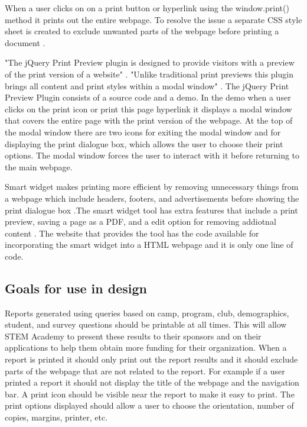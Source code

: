 \documentclass[12pt, draftclsnofoot, onecolumn]{IEEEtran}
\begin{document}
When a user clicks on on a print button or hyperlink using the window.print() method it prints out the entire webpage\cite{JavaScript}. To resolve the issue a separate CSS style sheet is created to exclude unwanted parts of the webpage before printing a document \cite{JavaScript}. 

"The jQuery Print Preview plugin is designed to provide visitors with a preview of the print version of a website" \cite{Sam}. "Unlike traditional print previews this plugin brings all content and print styles within a modal window" \cite{Sam}. The jQuery Print Preview Plugin consists of a source code and a demo. In the demo when a user clicks on the print icon or print this page hyperlink it displays a modal window that covers the entire page with the print version of the webpage. At the top of the modal window there are two icons for exiting the modal window and for displaying the print dialogue box, which allows the user to choose their print options. The modal window forces the user to interact with it before returning to the main webpage.

Smart widget makes printing more efficient by removing unnecessary things from a webpage which include headers, footers, and advertisements before showing the print dialogue box \cite{SmartW}.The smart widget tool has extra features that include a print preview, saving a page as a PDF, and a edit option for removing addiotnal content \cite{SmartW}. The website that provides the tool has the code available for incorporating the smart widget into a HTML webpage and it is only one line of code. 

\subsection{Goals for use in design}
Reports generated using queries based on camp, program, club, demographics, student, and survey questions should be printable at all times. This will allow STEM Academy to present these results to their sponsors and on their applications to help them obtain more funding for their organization. When a report is printed it should only print out the report results and it should exclude parts of the webpage that are not related to the report. For example if a user printed a report it should not display the title of the webpage and the navigation bar. A print icon should be visible near the report to make it easy to print. The print options displayed should allow a user to choose the orientation, number of copies, margins, printer, etc. 
\end{document}

